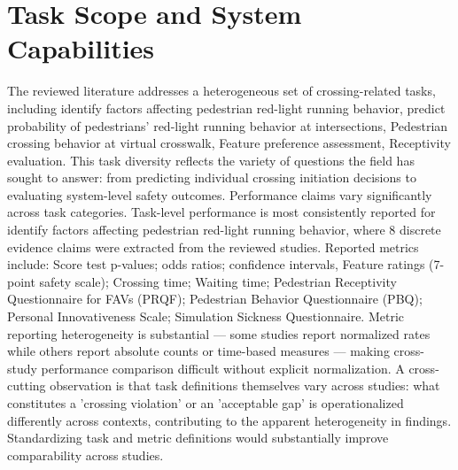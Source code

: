 \documentclass{article}
\begin{document}
\section{Task Scope and System Capabilities}
The reviewed literature addresses a heterogeneous set of crossing-related tasks, including identify factors affecting pedestrian red-light running behavior, predict probability of pedestrians' red-light running behavior at intersections, Pedestrian crossing behavior at virtual crosswalk, Feature preference assessment, Receptivity evaluation. This task diversity reflects the variety of questions the field has sought to answer: from predicting individual crossing initiation decisions to evaluating system-level safety outcomes. Performance claims vary significantly across task categories. Task-level performance is most consistently reported for identify factors affecting pedestrian red-light running behavior, where 8 discrete evidence claims were extracted from the reviewed studies. Reported metrics include: Score test p-values; odds ratios; confidence intervals, Feature ratings (7-point safety scale); Crossing time; Waiting time; Pedestrian Receptivity Questionnaire for FAVs (PRQF); Pedestrian Behavior Questionnaire (PBQ); Personal Innovativeness Scale; Simulation Sickness Questionnaire. Metric reporting heterogeneity is substantial — some studies report normalized rates while others report absolute counts or time-based measures — making cross-study performance comparison difficult without explicit normalization. A cross-cutting observation is that task definitions themselves vary across studies: what constitutes a 'crossing violation' or an 'acceptable gap' is operationalized differently across contexts, contributing to the apparent heterogeneity in findings. Standardizing task and metric definitions would substantially improve comparability across studies.
\end{document}

